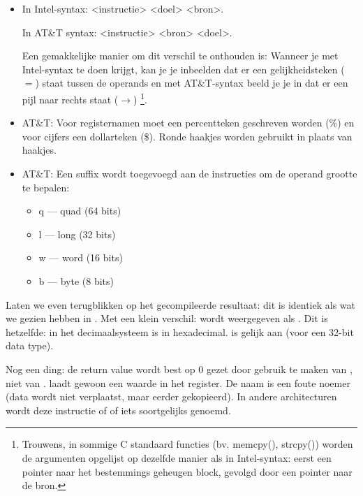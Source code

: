 \begin{itemize}

\item
\NLph{}

In Intel-syntax: <instructie> <doel> <bron>.

In AT\&T syntax: <instructie> <bron> <doel>.

Een gemakkelijke manier om dit verschil te onthouden is: 
Wanneer je met Intel-syntax te doen krijgt, kan je je inbeelden dat er een gelijkheidsteken ($=$) staat tussen de operands
en met AT\&T-syntax beeld je je in dat er een pijl naar rechts staat ($\rightarrow$)
\footnote{Trouwens, in sommige C standaard functies (bv. memcpy(), strcpy()) worden
de argumenten opgelijst op dezelfde manier als in Intel-syntax: eerst een pointer naar het bestemmings geheugen block, 
gevolgd door een pointer naar de bron.}.

\item
AT\&T: Voor registernamen moet een percentteken geschreven worden (\%) en voor cijfers een dollarteken (\$).
Ronde haakjes worden gebruikt in plaats van haakjes.

\item
AT\&T: Een suffix wordt toegevoegd aan de instructies om de operand grootte te bepalen:

\begin{itemize}
\item q --- quad (64 bits)
\item l --- long (32 bits)
\item w --- word (16 bits)
\item b --- byte (8 bits)
\end{itemize}

\end{itemize}

Laten we even terugblikken op het gecompileerde resultaat: dit is identiek als wat we gezien hebben in \IDA.
Met een klein verschil:  wordt weergegeven als .
Dit is hetzelfde:  in het decimaalsysteem is  in hexadecimal.
 is gelijk aan  (voor een 32-bit data type).

Nog een ding: de return value wordt best op 0 gezet door gebruik te maken van \MOV, niet van \XOR.
\MOV laadt gewoon een waarde in het register.
De naam is een foute noemer (data wordt niet verplaatst, maar eerder gekopieerd). In andere architecturen wordt deze instructie  of  of iets soortgelijks genoemd.

